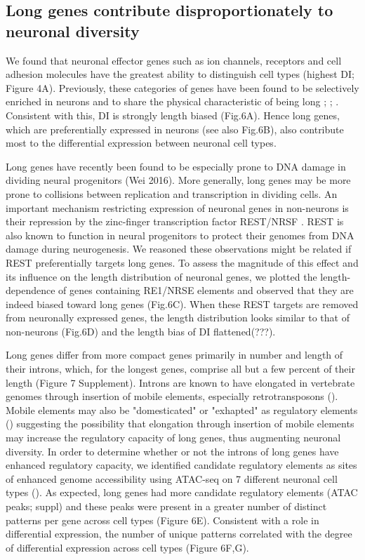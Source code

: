 \subsection{Long genes contribute disproportionately to neuronal diversity}

We found that neuronal effector genes such as ion channels, receptors and cell adhesion molecules have the greatest ability to distinguish cell types (highest DI; Figure 4A). Previously, these categories of genes have been found to be selectively enriched in neurons and to share the physical characteristic of being long \cite{Sugino_2014}; \cite{Gabel_2015}; \cite{Zylka_2015}. Consistent with this, DI is strongly length biased (Fig.6A). Hence long genes, which are preferentially expressed in neurons (see also Fig.6B), also contribute most to the differential expression between neuronal cell types. 

Long genes have recently been found to be especially prone to DNA damage in dividing neural progenitors (Wei 2016). More generally, long genes may be more prone to collisions between replication and transcription in dividing cells. An important mechanism restricting expression of neuronal genes in non-neurons is their repression by the zinc-finger transcription factor REST/NRSF \cite{RN1}\cite{RN2a}. REST is also known to function in neural progenitors to protect their genomes from DNA damage during neurogenesis\cite{Nechiporuk_2016}. We reasoned these observations might be related if REST preferentially targets long genes. To assess the magnitude of this effect and its influence on the length distribution of neuronal genes, we plotted the length-dependence of genes containing RE1/NRSE elements and observed that they are indeed biased toward long genes (Fig.6C). When these REST targets are removed from neuronally expressed genes, the length distribution looks similar to that of non-neurons (Fig.6D) and the length bias of DI flattened(???).

Long genes differ from more compact genes primarily in number and length of their introns, which, for the longest genes, comprise all but a few percent of their length (Figure 7 Supplement). Introns are known to have elongated in vertebrate genomes through insertion of mobile elements, especially retrotransposons (). Mobile elements may also be "domesticated" or "exhapted" as regulatory elements () suggesting the possibility that elongation through insertion of mobile elements may increase the regulatory capacity of long genes, thus augmenting neuronal diversity. In order to determine whether or not the introns of long genes have enhanced regulatory capacity, we identified candidate regulatory elements as sites of enhanced genome accessibility using ATAC-seq on 7 different neuronal cell types (). As expected, long genes had more candidate regulatory elements (ATAC peaks; suppl) and these peaks were present in a greater number of distinct patterns per gene across cell types (Figure 6E). Consistent with a role in differential expression, the number of unique patterns correlated with the degree of differential expression across cell types (Figure 6F,G).

